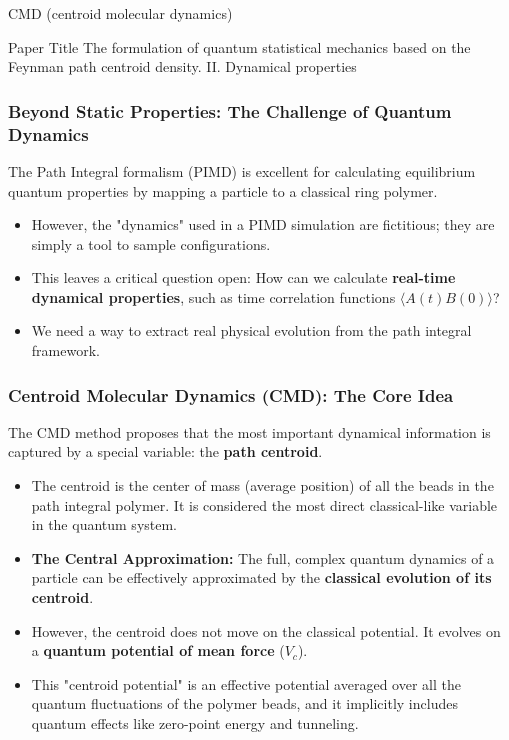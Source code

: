 
\begin{frame}{CMD (centroid molecular dynamics)}
	\begin{block}{Paper Title}
	The formulation of quantum statistical mechanics based on the Feynman path
centroid density. II. Dynamical properties
	\end{block}
\end{frame}

\begin{frame}
  \frametitle{Beyond Static Properties: The Challenge of Quantum Dynamics}
  
  The Path Integral formalism (PIMD) is excellent for calculating equilibrium quantum properties by mapping a particle to a classical ring polymer. \pause
  
  \begin{itemize}
    \item However, the "dynamics" used in a PIMD simulation are fictitious; they are simply a tool to sample configurations. \pause
    
    \item This leaves a critical question open: How can we calculate \textbf{real-time dynamical properties}, such as time correlation functions $\langle A(t)B(0)\rangle$? \pause
    
    \item We need a way to extract real physical evolution from the path integral framework.
  \end{itemize}
\end{frame}

\begin{frame}
  \frametitle{Centroid Molecular Dynamics (CMD): The Core Idea}
  
  The CMD method proposes that the most important dynamical information is captured by a special variable: the \textbf{path centroid}. \pause
  
  \begin{itemize}
    \item The centroid is the center of mass (average position) of all the beads in the path integral polymer. It is considered the most direct classical-like variable in the quantum system. \pause
    
    \item \textbf{The Central Approximation:} The full, complex quantum dynamics of a particle can be effectively approximated by the \textbf{classical evolution of its centroid}. \pause
    
    \item However, the centroid does not move on the classical potential. It evolves on a \textbf{quantum potential of mean force} ($V_c$). \pause
    
    \item This "centroid potential" is an effective potential averaged over all the quantum fluctuations of the polymer beads, and it implicitly includes quantum effects like zero-point energy and tunneling.
  \end{itemize}
\end{frame}

